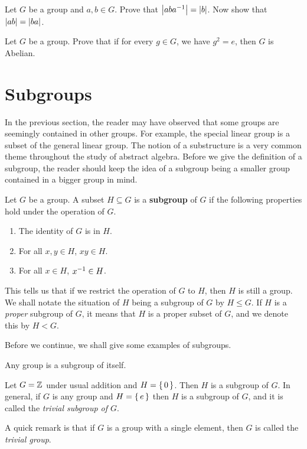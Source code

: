 \documentclass[./main.tex]{subfiles}
\begin{document}
\begin{prob}
    Let $G$ be a group and $a, b \in G$. Prove that $\abs{aba\inv} = \abs{b}$.
    Now show that $\abs{ab} = \abs{ba}$. 
\end{prob}

\begin{prob}
    Let $G$ be a group. Prove that if for every $g \in G$, we have $g^2 = e$,
    then $G$ is Abelian.
\end{prob}


\pagebreak
\section{Subgroups}
In the previous section, the reader may have observed that some groups are
seemingly contained in other groups. For example, the special linear group is a
subset of the general linear group. The notion of a substructure is a very
common theme throughout the study of abstract algebra. Before we give the
definition of a subgroup, the reader should keep the idea of a subgroup being a
smaller group contained in a bigger group in mind.

\begin{definition}[Subgroup]
\label{def:subgroup}
    Let $G$ be a group. A subset $H \subseteq G$ is a \textbf{subgroup} of $G$
    if the following properties hold under the operation of $G$.
    \begin{enumerate}
        \item The identity of $G$ is in $H$.
        \item For all $x, y \in H$, $xy \in H$.
        \item For all $x \in H$, $x ^{-1} \in H$.
    \end{enumerate}
\end{definition}
This tells us that if we restrict the operation of $G$ to $H$, then $H$ is still
a group. We shall notate the situation of $H$ being a subgroup of $G$ by $H \leq
G$. If $H$ is a \emph{proper} subgroup of $G$, it means that $H$ is a proper
subset of $G$, and we denote this by $H < G$.

Before we continue, we shall give some examples of subgroups.

\begin{example}
    Any group is a subgroup of itself.
\end{example}

\begin{example}
    Let $G = \mathbb{Z}$ under usual addition and $H = \set{0}$. Then $H$ is a subgroup of
    $G$. In general, if $G$ is any group and $H = \set{e}$ then $H$ is a
    subgroup of $G$, and it is called the \emph{trivial subgroup of $G$}. 
\end{example}
A quick remark is that if $G$ is a group with a single element, then $G$ is
called the \emph{trivial group}.
\end{document}
